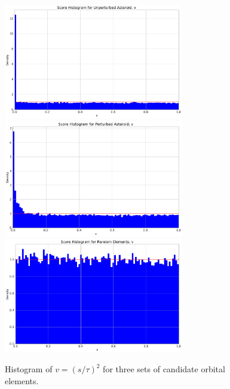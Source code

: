 \begin{figure}[hbt!]
\begin{center}
\includegraphics[width=0.70\textwidth]{../figs/elts/v_hist_unperturbed.png}
\includegraphics[width=0.70\textwidth]{../figs/elts/v_hist_perturbed.png}
\includegraphics[width=0.70\textwidth]{../figs/elts/v_hist_random.png}
\caption{Histogram of $v = (s/\tau)^2$ for three sets of candidate orbital elements.}
\end{center}
\end{figure}
\clearpage

